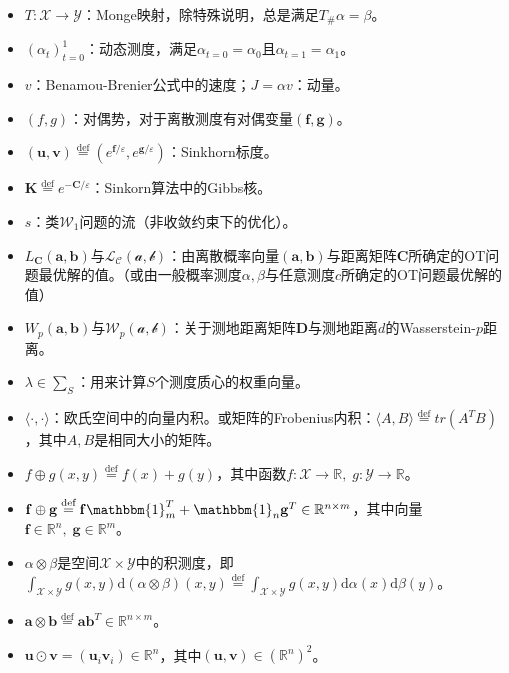 \documentclass[cn,10pt,math=newtx,citestyle=gb7714-2015,bibstyle=gb7714-2015]{elegantbook}
\begin{document}
\begin{itemize}
    \item $T:\mathcal{X}\to\mathcal{Y}$：Monge映射，除特殊说明，总是满足$T_\#\alpha=\beta$。
    \item $(\alpha_t)_{t=0}^1$：动态测度，满足$\alpha_{t=0}=\alpha_0$且$\alpha_{t=1}=\alpha_1$。
    \item $v$：Benamou-Brenier公式中的速度；$J=\alpha v$：动量。
    \item $(f,g)$：对偶势，对于离散测度有对偶变量$(\mathbf{f,g})$。
    \item $(\mathbf{u,v})\overset{\text{def}}{=} (e^{\mathbf{f}/\varepsilon},e^{\mathbf{g}/\varepsilon})$：Sinkhorn标度。
    \item $\mathbf{K}\overset{\text{def}}{=}e^{-\mathbf{C}/\varepsilon}$：Sinkorn算法中的Gibbs核。
    \item $s$：类$\mathcal{W}_1$问题的流（非收敛约束下的优化）。
    \item $L_{\mathbf{C}}(\mathbf{a,b})$与$\mathcal{L}_{\mathcal{C}}(\mathcal{a,b})$：由离散概率向量$(\mathbf{a,b})$与距离矩阵$\mathbf{C}$所确定的OT问题最优解的值。（或由一般概率测度$\alpha,\beta$与任意测度$c$所确定的OT问题最优解的值）
    \item $W_{p}(\mathbf{a,b})$与$\mathcal{W}_{p}(\mathcal{a,b})$：关于测地距离矩阵$\mathbf{D}$与测地距离$d$的Wasserstein-$p$距离。
    \item $\lambda\in\sum_S$：用来计算$S$个测度质心的权重向量。
    \item $\langle \cdot, \cdot\rangle$：欧氏空间中的向量内积。或矩阵的Frobenius内积：$\langle A,B\rangle\overset{\text{def}}{=}tr(A^TB)$，其中$A,B$是相同大小的矩阵。
    \item $f\oplus g(x,y)\overset{\text{def}}{=}f(x)+g(y)$，其中函数$f:\mathcal{X}\to \mathbb{R},\;g:\mathcal{Y}\to \mathbb{R}$。
    \item $\mathbf{f}\oplus \mathbf{g}\overset{\text{def}}{=}\mathbf{f}\mathbbm{1}_m^T+\mathbbm{1}_n\mathbf{g}^T\in\mathbb{R}^{n\times m}$，其中向量$\mathbf{f}\in\mathbb{R}^n,\;\mathbf{g}\in\mathbb{R}^m$。
    \item $\alpha \otimes \beta$是空间$\mathcal{X}\times \mathcal{Y}$中的积测度，即 $\int_{\mathcal{X}\times \mathcal{Y}} g(x,y) \text{d}(\alpha \otimes \beta)(x,y)\overset{\text{def}}{=} \int_{\mathcal{X}\times \mathcal{Y}} g(x,y)\text{d}\alpha(x)\text{d}\beta(y)$。
    \item $\mathbf{a}\otimes \mathbf{b}\overset{\text{def}}{=}\mathbf{ab}^T\in \mathbb{R}^{n\times m}$。
    \item $\mathbf{u}\odot \mathbf{v}=(\mathbf{u}_i\mathbf{v}_i)\in\mathbb{R}^n$，其中$(\mathbf{u},\mathbf{v})\in (\mathbb{R}^n)^2$。
    
\end{itemize}
\end{document}
